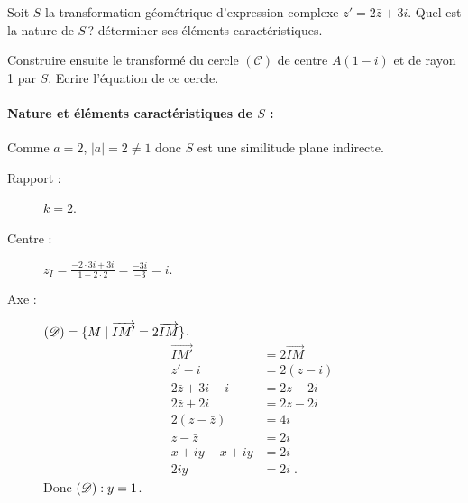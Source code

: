             \begin{ex}
                  Soit $S$ la transformation g\'eom\'etrique d'expression complexe $z'=2\bar{z}+3i$.
                  Quel est la nature de $S$\,? d\'eterminer ses \'el\'ements caract\'eristiques.
                  
                  Construire ensuite le transform\'e du cercle $(\mathscr{C})$ de centre $A(1-i)$ et de rayon 1 par $S$.
                  Ecrire l'\'equation de ce cercle.
                  \begin{valiny}
                  \begin{minipage}{.5\actualtextwidth}
                        \paragraph{Nature et \'el\'ements caract\'eristiques de $S$ :}
                              Comme $a = 2$, $|a| = 2 \neq 1$ donc $S$ est une similitude plane indirecte.
                              \begin{description}
                                    \item[Rapport :] $k = 2$.
                                    \item[Centre :] $z_I = \frac{-2 \cdot 3i + 3i}{1 - 2 \cdot 2} = \frac{-3i}{-3} = i$.
                                    \item[Axe :] $(\mathscr{D}) = \{ M \mid \overrightarrow{IM'} = 2 \overrightarrow{IM} \}$.
                                          \begin{align*}
                                                \overrightarrow{IM'} & = 2 \overrightarrow{IM} \\
                                                z' - i               & = 2 ( z - i )           \\
                                                2 \bar{z} + 3i - i   & = 2 z - 2 i             \\
                                                2 \bar{z} + 2 i      & = 2 z - 2 i             \\
                                                2 (z - \bar{z})      & = 4 i                   \\
                                                z - \bar{z}          & = 2 i                   \\
                                                x + i y - x + i y    & = 2 i                   \\
                                                2 i y                & = 2 i                   \;.
                                          \end{align*}
                                          Donc $(\mathscr{D}) : y = 1$.
                              \end{description}

\end{minipage}
\end{valiny}
\end{ex}
